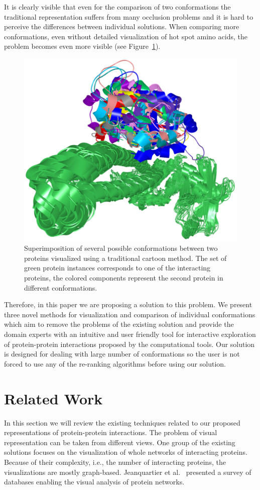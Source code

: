 \documentclass[journal]{vgtc}                %
\begin{document}
It is clearly visible that even for the comparison of two conformations the traditional representation suffers from many occlusion problems and it is hard to perceive the differences between individual solutions.
When comparing more conformations, even without detailed visualization of hot spot amino acids, the problem becomes even more visible (see Figure~\ref{fig:problem}).

\begin{figure}[bt]
  \centering
  \includegraphics[width=0.7\columnwidth]{problem.png}
  \caption{Superimposition of several possible conformations between two proteins visualized using a traditional cartoon method. The set of green protein instances corresponds to one of
the interacting proteins, the colored components represent the second protein in different conformations.}
  \label{fig:problem}
\end{figure}

Therefore, in this paper we are proposing a solution to this problem.
We present three novel methods for visualization and comparison of individual conformations which aim to remove the problems of the existing solution and provide the domain experts with an intuitive and user friendly tool for interactive exploration of protein-protein interactions proposed by the computational tools.
Our solution is designed for dealing with large number of conformations so the user is not forced to use any of the re-ranking algorithms before using our solution. 

\section{Related Work}
In this section we will review the existing techniques related to our proposed representations of protein-protein interactions.
The problem of visual representation can be taken from different views.
One group of the existing solutions focuses on the visualization of whole networks of interacting proteins.
Because of their complexity, i.e., the number of interacting proteins, the visualizations are mostly graph-based.
Jeanquartier et al.~\cite{Jeanquartier2015} presented a survey of databases enabling the visual analysis of protein networks.
\end{document}
